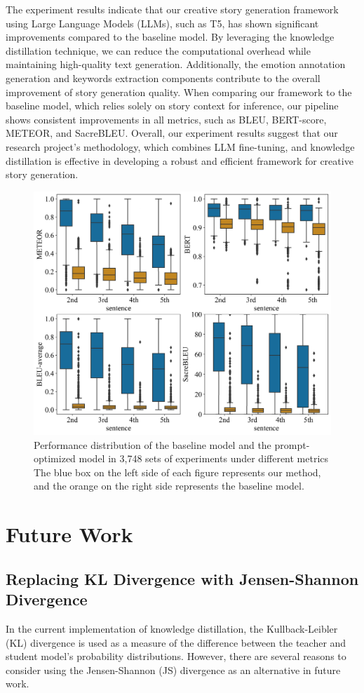 \documentclass{article} %
\begin{document}
The experiment results indicate that our creative story generation framework using Large Language Models (LLMs), such as T5, has shown significant improvements compared to the baseline model. By leveraging the knowledge distillation technique, we can reduce the computational overhead while maintaining high-quality text generation. Additionally, the emotion annotation generation and keywords extraction components contribute to the overall improvement of story generation quality. When comparing our framework to the baseline model, which relies solely on story context for inference, our pipeline shows consistent improvements in all metrics, such as BLEU, BERT-score, METEOR, and SacreBLEU. Overall, our experiment results suggest that our research project's methodology, which combines LLM fine-tuning, and knowledge distillation is effective in developing a robust and efficient framework for creative story generation.

\begin{figure}[h]
    \centering
    \includegraphics[width = 0.6\linewidth]{figure/RESULT_1.jpg}
    \caption{Performance distribution of the baseline model and the prompt-optimized model in 3,748 sets of experiments under different metrics The blue box on the left side of each figure represents our method, and the orange on the right side represents the baseline model.}
    \label{metricCompare-baseline}
\end{figure}

\section{Future Work}
\subsection{Replacing KL Divergence with Jensen-Shannon Divergence}
In the current implementation of knowledge distillation, the Kullback-Leibler (KL) divergence is used as a measure of the difference between the teacher and student model's probability distributions. However, there are several reasons to consider using the Jensen-Shannon (JS) divergence as an alternative in future work.
\end{document}
